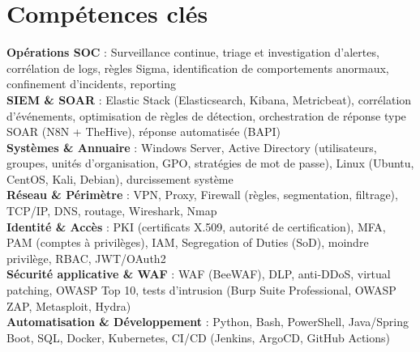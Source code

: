 \documentclass[a4paper,9pt]{article}
\begin{document}
\section{Compétences clés}
\textbf{Opérations SOC} : Surveillance continue, triage et investigation d'alertes, corrélation de logs, règles Sigma, identification de comportements anormaux, confinement d'incidents, reporting\\[0.3pt]
\textbf{SIEM \& SOAR} : Elastic Stack (Elasticsearch, Kibana, Metricbeat), corrélation d'événements, optimisation de règles de détection, orchestration de réponse type SOAR (N8N + TheHive), réponse automatisée (BAPI)\\[0.3pt]
\textbf{Systèmes \& Annuaire} : Windows Server, Active Directory (utilisateurs, groupes, unités d'organisation, GPO, stratégies de mot de passe), Linux (Ubuntu, CentOS, Kali, Debian), durcissement système\\[0.3pt]
\textbf{Réseau \& Périmètre} : VPN, Proxy, Firewall (règles, segmentation, filtrage), TCP/IP, DNS, routage, Wireshark, Nmap\\[0.3pt]
\textbf{Identité \& Accès} : PKI (certificats X.509, autorité de certification), MFA, PAM (comptes à privilèges), IAM, Segregation of Duties (SoD), moindre privilège, RBAC, JWT/OAuth2\\[0.3pt]
\textbf{Sécurité applicative \& WAF} : WAF (BeeWAF), DLP, anti-DDoS, virtual patching, OWASP Top 10, tests d'intrusion (Burp Suite Professional, OWASP ZAP, Metasploit, Hydra)\\[0.3pt]
\textbf{Automatisation \& Développement} : Python, Bash, PowerShell, Java/Spring Boot, SQL, Docker, Kubernetes, CI/CD (Jenkins, ArgoCD, GitHub Actions)
\end{document}
